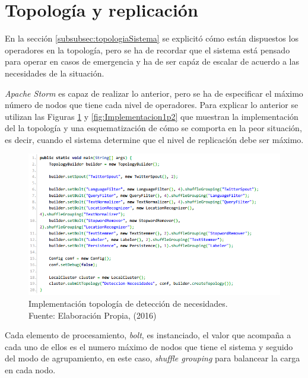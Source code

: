 \section{Topología y replicación}
\label{sec:topYPar}

En la sección \ref{subsubsec:topologiaSistema} se explicitó cómo están dispuestos los operadores en la topología, pero se ha de recordar que el sistema está pensado para operar en casos de emergencia y ha de ser capáz de escalar de acuerdo a las necesidades de la situación.

\textit{Apache Storm} es capaz de realizar lo anterior, pero se ha de especificar el máximo número de nodos que tiene cada nivel de operadores. Para explicar lo anterior se utilizan las Figuras \ref{fig:Implementacion1} y \ref{fig:Implementacion1p2} que muestran la implementación del la topología y una esquematización de cómo se comporta en la peor situación, es decir, cuando el sistema determine que el nivel de replicación debe ser máximo.

\begin{figure}[H]
	\centering
	\captionsetup{justification=centering}
	\includegraphics[scale=0.8]{images/ImplementacionTopologia1.png}
	\caption[Implementación topología de detección de necesidades.]{Implementación topología de detección de necesidades.\\Fuente: Elaboración Propia, (2016)}
	\label{fig:Implementacion1}
\end{figure}

Cada elemento de procesamiento, \textit{bolt}, es instanciado, el valor que acompaña a cada uno de ellos es el numero máximo de nodos que tiene el sistema y seguido del modo de agrupamiento, en este caso, \textit{shuffle grouping} para balancear la carga en cada nodo.

